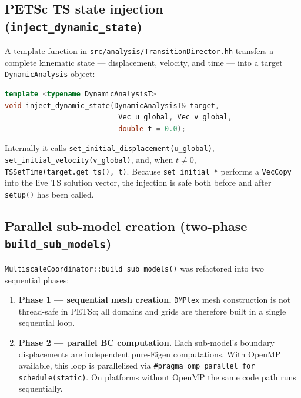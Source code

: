 \subsection{PETSc TS state injection (\texttt{inject\_dynamic\_state})}

A template function in \texttt{src/analysis/TransitionDirector.hh} transfers
a complete kinematic state — displacement, velocity, and time — into a target
\texttt{DynamicAnalysis} object:

\begin{lstlisting}[language=C++,caption={inject\_dynamic\_state},
                   label={lst:inject_dynamic_state}]
template <typename DynamicAnalysisT>
void inject_dynamic_state(DynamicAnalysisT& target,
                           Vec u_global, Vec v_global,
                           double t = 0.0);
\end{lstlisting}

Internally it calls \texttt{set\_initial\_displacement(u\_global)},
\texttt{set\_initial\_velocity(v\_global)}, and, when $t \neq 0$,
\texttt{TSSetTime(target.get\_ts(), t)}.  Because \texttt{set\_initial\_*}
performs a \texttt{VecCopy} into the live TS solution vector, the
injection is safe both before and after \texttt{setup()} has been called.

\subsection{Parallel sub-model creation (two-phase \texttt{build\_sub\_models})}

\texttt{MultiscaleCoordinator::build\_sub\_models()} was refactored into two
sequential phases:

\begin{enumerate}
  \item \textbf{Phase 1 — sequential mesh creation.}  \texttt{DMPlex} mesh
    construction is not thread-safe in PETSc; all domains and grids are
    therefore built in a single sequential loop.

  \item \textbf{Phase 2 — parallel BC computation.}  Each sub-model's
    boundary displacements are independent pure-Eigen computations.  With
    OpenMP available, this loop is parallelised via
    \verb|#pragma omp parallel for schedule(static)|.  On platforms without
    OpenMP the same code path runs sequentially.
\end{enumerate}

